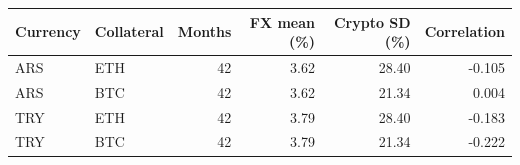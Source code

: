 \begin{tabular}{llrrrr}
\toprule
Currency & Collateral & Months & FX mean (\%) & Crypto SD (\%) & Correlation \\
\midrule
ARS & ETH & 42 & 3.62 & 28.40 & -0.105 \\
ARS & BTC & 42 & 3.62 & 21.34 & 0.004 \\
TRY & ETH & 42 & 3.79 & 28.40 & -0.183 \\
TRY & BTC & 42 & 3.79 & 21.34 & -0.222 \\
\bottomrule
\end{tabular}
